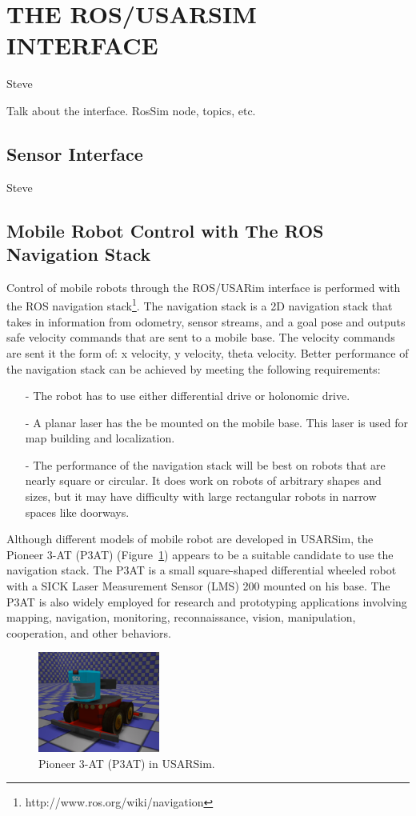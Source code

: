\section*{THE ROS/USARSIM INTERFACE}\label{s:interface}
Steve

Talk about the interface. RosSim node, topics, etc.
\subsection*{Sensor Interface}
Steve
\subsection*{Mobile Robot Control with The ROS Navigation Stack}
Control of mobile robots through the ROS/USARim interface is performed with the ROS navigation stack\footnote{http://www.ros.org/wiki/navigation}. The navigation stack is a 2D navigation stack that takes in information from odometry, sensor streams, and a goal pose and outputs safe velocity commands that are sent to a mobile base. The velocity commands are sent it the form of: x velocity, y velocity, theta velocity. Better performance of the navigation stack can be achieved by meeting the following requirements:
\begin{itemize}
\item[-] The robot has to use either differential drive or holonomic drive.
\item[-] A planar laser has the be mounted on the mobile base. This laser is used for map building and localization.
\item[-] The performance of the navigation stack will be best on robots that are nearly square or circular. It does work on robots of arbitrary shapes and sizes, but it may have difficulty with large rectangular robots in narrow spaces like doorways.
\end{itemize}

Although different models of mobile robot are developed in USARSim, the Pioneer 3-AT (P3AT) (Figure~\ref{fig:p3at}) appears to be a suitable candidate to use the navigation stack. The P3AT is a small square-shaped differential wheeled robot with a SICK Laser Measurement Sensor (LMS) 200 mounted on his base. The P3AT is also widely employed for research and prototyping applications involving mapping, navigation, monitoring, reconnaissance, vision, manipulation, cooperation, and other behaviors.

\begin{figure}[t!]
\centering
\includegraphics[width=4cm]{Figures/Robots/P3AT.eps}
\caption{Pioneer 3-AT (P3AT) in USARSim.}\label{fig:p3at}
\end{figure}




